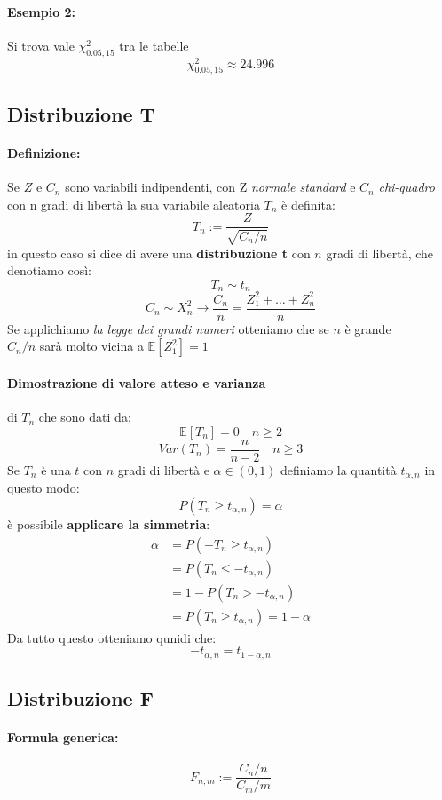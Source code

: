 \documentclass[]{article}
\newcommand{\ev}{\mathbb{E}[X]}
\renewcommand{\ev}[1]{\mathbb{E}[#1]}
\newcommand{\definizione}{\paragraph{Definizione:}}
\newcommand{\formula}{\paragraph{Formula generica:}}
\begin{document}
    \paragraph{Esempio 2:} Si trova vale $\chi_{0.05, 15}^2$ tra le tabelle
    \[ \chi_{0.05, 15}^2 \approx 24.996 \]
    \newpage
    \subsection{Distribuzione T}
    \definizione Se $Z$ e $C_n$ sono variabili indipendenti, con Z \textit{normale standard} e $C_n$ \textit{chi-quadro} con n gradi di libertà
    la sua variabile aleatoria $T_n$ è definita:
    \[ T_n := \frac{Z}{\sqrt{C_n / n}} \]
    in questo caso si dice di avere una \textbf{distribuzione t} con $n$ gradi di libertà, che denotiamo così:
    \[ T_n \sim t_n \]
    \[ C_n \sim X^2_n \longrightarrow \frac{C_n}{n} = \frac{Z_1^2 + \ldots + Z_n^2}{n} \]
    Se applichiamo \textit{la legge dei grandi numeri} otteniamo che se $n$ è grande \\
    $C_n / n$ sarà molto vicina a $\ev{Z_1^2} = 1$
    \paragraph{Dimostrazione di valore atteso e varianza} di $T_n$ che sono dati da:
    \[ \ev{T_n} = 0 \quad n \geq 2 \]
    \[ Var(T_n) = \frac{n}{n-2} \quad n \geq 3 \]
    Se $T_n$ è una $t$ con $n$ gradi di libertà e $\alpha \in(0,1)$ definiamo la quantità $t_{\alpha,n}$ in questo modo:
    \[ P(T_n \geq t_{\alpha,n}) = \alpha \]
    è possibile \textbf{applicare la simmetria}:\
    \begin{equation*}
        \begin{split}
            \alpha &= P(-T_n \geq t_{\alpha, n}) \\
            &= P(T_n \leq -t_{\alpha, n}) \\
            &= 1 - P(T_n > -t_{\alpha, n}) \\
            &= P(T_n \geq t_{\alpha, n}) = 1 - \alpha
        \end{split}
    \end{equation*}
    Da tutto questo otteniamo qunidi che:
    \[ -t_{\alpha, n} = t_{1-\alpha, n}\]
    \newpage
    \subsection{Distribuzione F}
    \formula 
    \[ F_{n, m} := \frac{C_n / n}{C_m / m}\]
\end{document}
